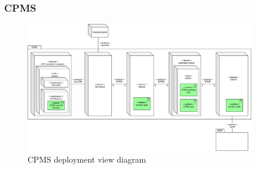 \subsubsection{\ac{CPMS}}
\begin{figure}[!h]
    \begin{center}
        \includegraphics[keepaspectratio, width=0.9\textwidth]{Graphics/DD-CPMS-deployment.drawio.png}
        \caption{CPMS deployment view diagram}
        \label{fig:CPMS-deployment}
    \end{center}
\end{figure}

